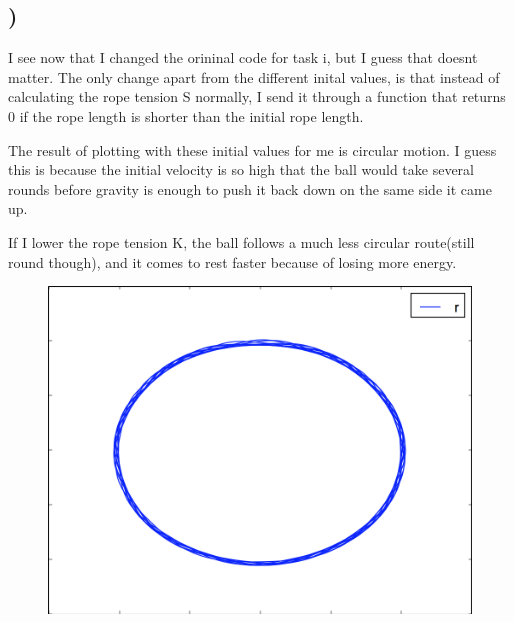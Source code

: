 \documentclass[a4paper,10pt,norsk]{article}
\begin{document}
 \subsection{)}
 I see now that I changed the orininal code for task i, but I guess that doesnt matter. The only change apart from the different inital values, is that instead of calculating the rope tension S normally, I send it through a function that returns 0 if the rope length is shorter than the initial rope length.
 
 The result of plotting with these initial values for me is circular motion.
 I guess this is because the initial velocity is so high that the ball would take several rounds before gravity is enough to push it back down on the same side it came up.
 
 If I lower the rope tension K, the ball follows a much less circular route(still round though), and it comes to rest faster because of losing more energy.
 \begin{figure}[h!]
        \centering 
        \includegraphics[scale=0.5]{oppg_m.png}
\end{figure}
 
 
\end{document}
